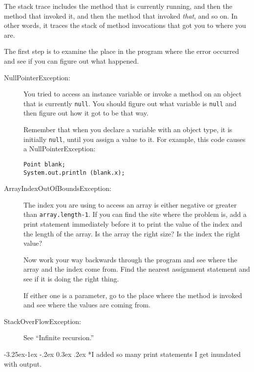 \documentclass{book}
\makeatletter
\renewcommand\subsection{\@startsection {subsection}{2}{0mm}%
    {-3.25ex\@plus -1ex \@minus -.2ex}%
    {0.3ex \@plus .2ex}%
    {\normalfont\large\bfseries}}
\makeatother
\begin{document}
The stack trace includes the method that is currently running,
and then the method that invoked it, and then the method that
invoked {\em that}, and so on.  In other words, it traces the
stack of method invocations that got you to where you are.

The first step is to examine the place in the program where
the error occurred and see if you can figure out what happened.

\begin{description}

\item[NullPointerException:] You tried to access an instance
variable or invoke a method on an object that is currently
{\tt null}.  You should figure out what variable is {\tt null}
and then figure out how it got to be that way.

Remember that when you declare a variable with an object type,
it is initially {\tt null}, until you assign a value to it.
For example, this code causes a NullPointerException:

\begin{verbatim}
Point blank;
System.out.println (blank.x);
\end{verbatim}

\item[ArrayIndexOutOfBoundsException:] The index you are using
to access an array is either negative or greater than
{\tt array.length-1}.  If you can find the site where the
problem is, add a print statement immediately before it to
print the value of the index and the length of the array.
Is the array the right size?  Is the index the right value?

Now work your way backwards through the program and see where
the array and the index come from.  Find the nearest assignment
statement and see if it is doing the right thing.

If either one is a parameter, go to the place where the method
is invoked and see where the values are coming from.

\item[StackOverFlowException:] See ``Infinite recursion.''

\end{description}


\subsection*{I added so many print statements I get inundated with
output.}
\end{document}
